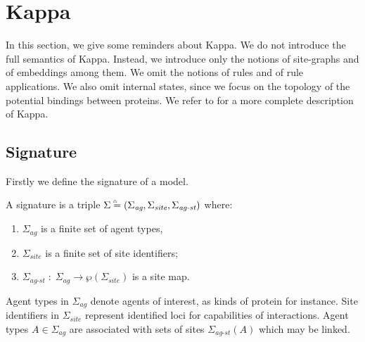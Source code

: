 \documentclass{entcs}
\newcommand{\agentname}{\signaturesymb_{\textit{ag}}}
\newcommand{\sitename}{\signaturesymb_{\textit{site}}}
\newcommand{\linksite}{\signaturesymb_{\textit{ag-st}}}
\newcommand{\signaturesymb}{\Sigma}
\newcommand{\signaturetuple}{(\agentname,\sitename,\linksite)}
\newcommand{\bydef}{\stackrel{\scalebox{0.8}{\!\!$\scriptscriptstyle{\triangle}$}}{=}}
\begin{document}
\section{Kappa}

\label{sec:kappa}

In this section, we give some reminders about Kappa.
We do not introduce the full semantics of Kappa. Instead, we introduce only the notions of site-graphs and of embeddings among them. We omit the notions of rules and of rule applications. We also omit internal states, since we focus on the topology of the potential bindings between proteins.   We refer to \cite{DBLP:journals/tcs/DanosL04,Feret_IJSI2013} for a more complete description of Kappa.

\subsection{Signature}

Firstly we define the signature of a model.
\begin{defn}[signature]
\label{def:signature}
A signature is a triple $\signaturesymb\bydef\signaturetuple$ where: \begin{enumerate}\item $\agentname$ is a finite set of agent types, \item $\sitename$ is a finite set of site identifiers; \item $\linksite\;:\;\agentname \rightarrow \wp(\sitename)$ is a site map.
\end{enumerate}\end{defn}


Agent types in $\agentname$ denote agents of interest, as kinds of protein  for instance.
Site identifiers in $\sitename$ represent identified loci for capabilities of interactions.
Agent types $A\in\agentname$ are associated with sets of sites $\linksite(A)$ which may be linked.
\end{document}
